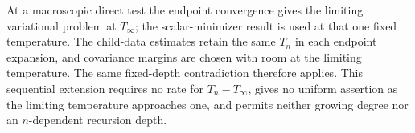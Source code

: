 At a macroscopic direct test the endpoint convergence gives the
limiting variational problem at $T_\infty$; the scalar-minimizer
result  is used at that one fixed
temperature. The child-data estimates retain the same $T_n$ in
each endpoint expansion, and covariance margins are chosen with room
at the limiting temperature. The same fixed-depth contradiction
therefore applies. This sequential extension requires no rate for
$T_n-T_\infty$, gives no uniform assertion as the limiting temperature
approaches one, and permits neither growing degree nor an
$n$-dependent recursion depth.
